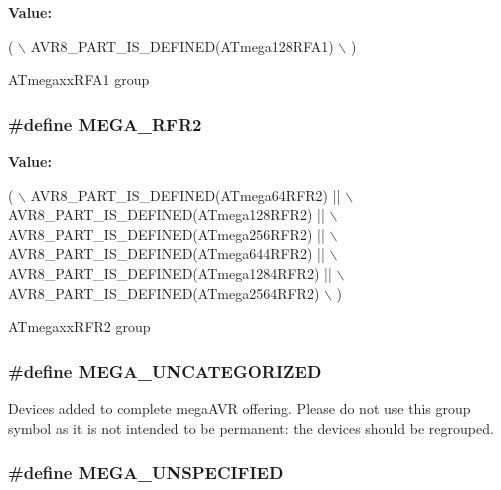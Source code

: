 {\bfseries Value\-:}
\begin{DoxyCode}
( \(\backslash\)
                AVR8\_PART\_IS\_DEFINED(ATmega128RFA1) \(\backslash\)
                )
\end{DoxyCode}
A\-Tmegaxx\-R\-F\-A1 group \hypertarget{group__mega__part__macros__group_gaa5278eedfdfffaeb7c2c49aff7c2eb97}{
\subsubsection[{M\-E\-G\-A\-\_\-\-R\-F\-R2}]{\setlength{\rightskip}{0pt plus 5cm}\#define M\-E\-G\-A\-\_\-\-R\-F\-R2}}\label{group__mega__part__macros__group_gaa5278eedfdfffaeb7c2c49aff7c2eb97}
{\bfseries Value\-:}
\begin{DoxyCode}
( \(\backslash\)
                AVR8\_PART\_IS\_DEFINED(ATmega64RFR2)   || \(\backslash\)
                AVR8\_PART\_IS\_DEFINED(ATmega128RFR2)  || \(\backslash\)
                AVR8\_PART\_IS\_DEFINED(ATmega256RFR2)  || \(\backslash\)
                AVR8\_PART\_IS\_DEFINED(ATmega644RFR2)  || \(\backslash\)
                AVR8\_PART\_IS\_DEFINED(ATmega1284RFR2) || \(\backslash\)
                AVR8\_PART\_IS\_DEFINED(ATmega2564RFR2) \(\backslash\)
                )
\end{DoxyCode}
A\-Tmegaxx\-R\-F\-R2 group \hypertarget{group__mega__part__macros__group_ga9252d02a9216d5e9bf94000667ad6cb1}{
\subsubsection[{M\-E\-G\-A\-\_\-\-U\-N\-C\-A\-T\-E\-G\-O\-R\-I\-Z\-E\-D}]{\setlength{\rightskip}{0pt plus 5cm}\#define M\-E\-G\-A\-\_\-\-U\-N\-C\-A\-T\-E\-G\-O\-R\-I\-Z\-E\-D}}\label{group__mega__part__macros__group_ga9252d02a9216d5e9bf94000667ad6cb1}
Devices added to complete mega\-A\-V\-R offering. Please do not use this group symbol as it is not intended to be permanent\-: the devices should be regrouped. \hypertarget{group__mega__part__macros__group_gaabb3078f36ad4d875915bd54fa46f337}{
\subsubsection[{M\-E\-G\-A\-\_\-\-U\-N\-S\-P\-E\-C\-I\-F\-I\-E\-D}]{\setlength{\rightskip}{0pt plus 5cm}\#define M\-E\-G\-A\-\_\-\-U\-N\-S\-P\-E\-C\-I\-F\-I\-E\-D}}\label{group__mega__part__macros__group_gaabb3078f36ad4d875915bd54fa46f337}
